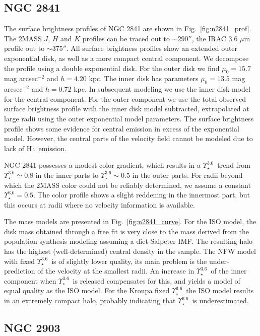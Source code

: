 \documentclass[usenatbib,usegraphicx,apjfonts,floatfix]{emulateapj}
\newcommand{\HI}{H\,{\sc i}}
\newcommand{\Ups}{\ensuremath{\Upsilon_{\star}^{3.6}}}
\begin{document}
\subsection{NGC 2841}

The surface brightness profiles of NGC 2841 are shown in
Fig.~\ref{fig:n2841_prof}. The 2MASS $J$, $H$ and $K$ profiles can be
traced out to $\sim 290''$, the IRAC 3.6 $\mu$m profile out to $\sim
375''$.  All surface brightness profiles show an extended outer
exponential disk, as well as a more compact central component. We
decompose the profile using a double exponential disk. For the outer
disk we find $\mu_0 = 15.7$ mag arcsec$^{-2}$ and $h = 4.20$ kpc. The
inner disk has parameters $\mu_0 = 13.5$ mag arcsec$^{-2}$ and
$h=0.72$ kpc.  In subsequent modeling we use the inner disk model for
the central component. For the outer component we use the total
observed surface brightness profile with the inner disk model
subtracted, extrapolated at large radii using the outer exponential
model parameters.  The surface brightness profile shows some evidence
for central emission in excess of the exponential model. However, the
central parts of the velocity field cannot be modeled due to lack of
\HI\ emission. 

NGC 2841 possesses a modest color gradient, which results in a \Ups\
trend from $\Ups \simeq 0.8$ in the inner parts to $\Ups \sim 0.5$ in
the outer parts.  For radii beyond which the 2MASS color could not be
reliably determined, we assume a constant $\Ups = 0.5$.  The color
profile shows a slight reddening in the innermost part, but this
occurs at radii where no velocity information is available.

The mass models are presented in Fig.~\ref{fig:n2841_curve}.  For the
ISO model, the disk mass obtained through a free fit is very close to
the mass derived from the population synthesis modeling assuming a
diet-Salpeter IMF.  The resulting halo has the highest
(well-determined) central density in the sample. The NFW model with
fixed \Ups\ is of slightly lower quality, its main problem is the
under-prediction of the velocity at the smallest radii. An increase in
\Ups\ of the inner component when \Ups\ is released compensates for
this, and yields a model of equal quality as the ISO model.  For the
Kroupa fixed \Ups\ the ISO model results in an extremely compact halo,
probably indicating that \Ups\ is underestimated.


\subsection{NGC 2903}
\end{document}
